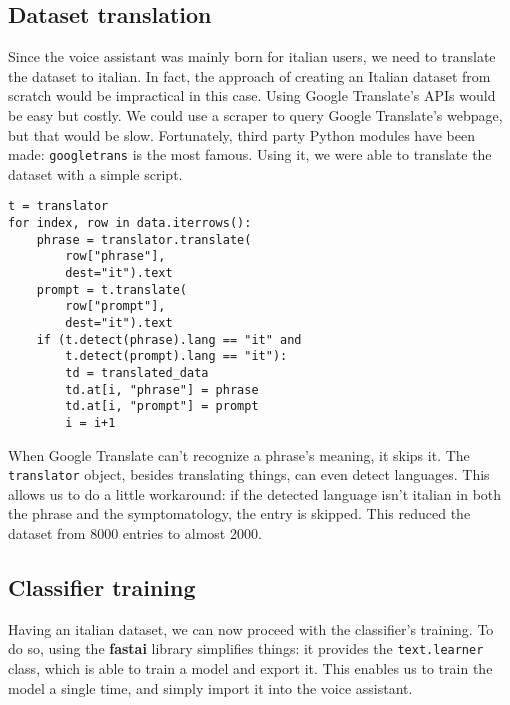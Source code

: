 \documentclass[conference]{IEEEtran}
\begin{document}
\subsection{Dataset translation}
Since the voice assistant was mainly born for italian users, we need to translate the dataset to italian. In fact, the approach of creating an Italian dataset from scratch\cite{lombardo-mtaa,lombardo-lnicst} would be impractical in this case. Using Google Translate's APIs would be easy but costly. We could use a scraper to query Google Translate's webpage, but that would be slow. Fortunately, third party Python modules have been made: \texttt{googletrans} is the most famous. Using it, we were able to translate the dataset with a simple script.
\begin{verbatim}
t = translator
for index, row in data.iterrows():
    phrase = translator.translate(
        row["phrase"], 
        dest="it").text
    prompt = t.translate(
        row["prompt"],
        dest="it").text
    if (t.detect(phrase).lang == "it" and
        t.detect(prompt).lang == "it"):
        td = translated_data
        td.at[i, "phrase"] = phrase 
        td.at[i, "prompt"] = prompt 
        i = i+1
\end{verbatim}
When Google Translate can't recognize a phrase's meaning, it skips it. The \texttt{translator} object, besides translating things, can even detect languages. This allows us to do a little workaround: if the detected language isn't italian in both the phrase and the symptomatology, the entry is skipped. This reduced the dataset from 8000 entries to almost 2000.
\subsection{Classifier training}
Having an italian dataset, we can now proceed with the classifier's training. To do so, using the \textbf{fastai} library simplifies things: it provides the \texttt{text.learner} class, which is able to train a model and export it. This enables us to train the model a single time, and simply import it into the voice assistant.
\end{document}

